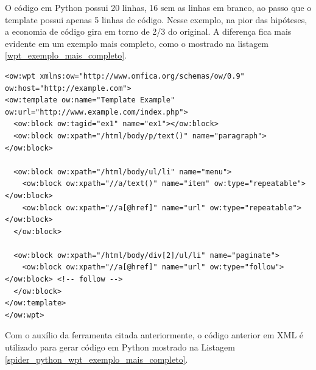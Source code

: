 O código em Python possui 20 linhas, 16 sem as linhas em branco, ao passo que o template possui apenas 5 linhas de código. Nesse exemplo, na pior das hipóteses, a economia de código gira em torno de 2/3 do original. A diferença fica mais evidente em um exemplo mais completo, como o mostrado na listagem \ref{wpt_exemplo_mais_completo}.

\begin{lstlisting}[label=wpt_exemplo_mais_completo]
<ow:wpt xmlns:ow="http://www.omfica.org/schemas/ow/0.9"
ow:host="http://example.com">
<ow:template ow:name="Template Example" ow:url="http://www.example.com/index.php">
  <ow:block ow:tagid="ex1" name="ex1"></ow:block>
  <ow:block ow:xpath="/html/body/p/text()" name="paragraph"></ow:block>
  
  <ow:block ow:xpath="/html/body/ul/li" name="menu">
    <ow:block ow:xpath="//a/text()" name="item" ow:type="repeatable"></ow:block>
    <ow:block ow:xpath="//a[@href]" name="url" ow:type="repeatable"></ow:block>
  </ow:block>
  
  <ow:block ow:xpath="/html/body/div[2]/ul/li" name="paginate">
    <ow:block ow:xpath="//a[@href]" name="url" ow:type="follow"></ow:block> <!-- follow -->
  </ow:block>
</ow:template> 
</ow:wpt>
\end{lstlisting}

Com o auxílio da ferramenta citada anteriormente, o código anterior em XML é utilizado para gerar código em Python mostrado na Listagem \ref{spider_python_wpt_exemplo_mais_completo}.

